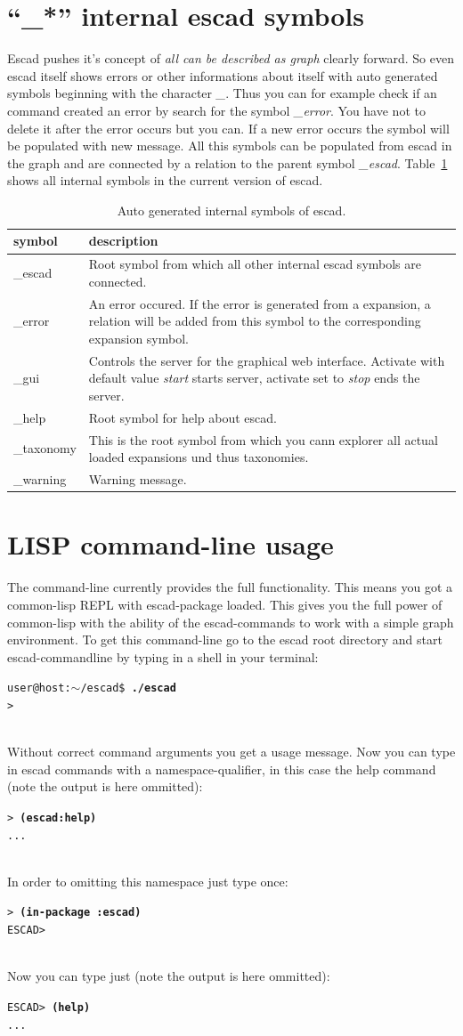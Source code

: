 \documentclass[a4paper, 12pt, openany]{scrbook}
\makeatletter
\newcommand{\shellcmdline}[2]{\\
  \setlength{\fboxsep}{2pt}\colorbox{black!20}{\parbox{\textwidth}{\texttt{user@host:$\sim$/escad\$ \textbf{#1}\\#2}}}\\}
\newcommand{\escadcmdline}[2]{\\\setlength{\fboxsep}{2pt}\colorbox{black!20}{\parbox{\textwidth}{\texttt{ESCAD> \textbf{#1}\\#2}}}\\}
\newcommand{\lispcmdline}[2]{\\\setlength{\fboxsep}{2pt}\colorbox{black!20}{\parbox{\textwidth}{\texttt{> \textbf{#1}\\#2}}}\\}
\makeatother
\begin{document}
\section{``\_*'' internal escad symbols}
Escad pushes it's concept of \emph{all can be described as graph} clearly forward. So even escad itself shows errors or other informations about itself with auto generated symbols beginning with the character \emph{\_}. Thus you can for example check if an command created an error by search for the symbol \emph{\_error}. You have not to delete it after the error occurs but you can. If a new error occurs the symbol will be populated with new message. All this symbols can be populated from escad in the graph and are connected by a relation to the parent symbol \emph{\_escad}.
Table~\ref{tab:internal-symbols} shows all internal symbols in the current version of escad.
\begin{table}[htbp]
\centering
\begin{tabular}{|p{2.5cm}|p{13cm}|}
  \hline
  \textbf{symbol} & \textbf{description} \\
  \hline
  \_escad & Root symbol from which all other internal escad symbols are connected. \\
  \hline
  \_error & An error occured. If the error is generated from a expansion, a relation will be added from this symbol to the corresponding expansion symbol. \\
  \hline
  \_gui & Controls the server for the graphical web interface. Activate with default value \emph{start} starts server, activate set to \emph{stop} ends the server. \\
  \hline
  \_help & Root symbol for help about escad. \\
  \hline
  \_taxonomy & This is the root symbol from which you cann explorer all actual loaded expansions und thus taxonomies. \\
  \hline
  \_warning & Warning message. \\
  \hline
\end{tabular}
\caption{Auto generated internal symbols of escad.}
\label{tab:internal-symbols}
\end{table}
\section{LISP command-line usage}\label{sec:cmd_line}
The command-line currently provides the full functionality. This means you got a common-lisp REPL with escad-package loaded. This gives you the full power of common-lisp with the ability of the escad-commands to work with a simple graph environment. To get this command-line go to the escad root directory and start escad-commandline by typing in a shell in your terminal:
\shellcmdline{./escad}{>}
Without correct command arguments you get a usage message.
Now you can type in escad commands with a namespace-qualifier, in this case the help command (note the output is here ommitted):
\lispcmdline{(escad:help)}{...}
In order to omitting this namespace just type once:
\lispcmdline{(in-package :escad)}{ESCAD>}
Now you can type just (note the output is here ommitted):
\escadcmdline{(help)}{...}
\end{document}
